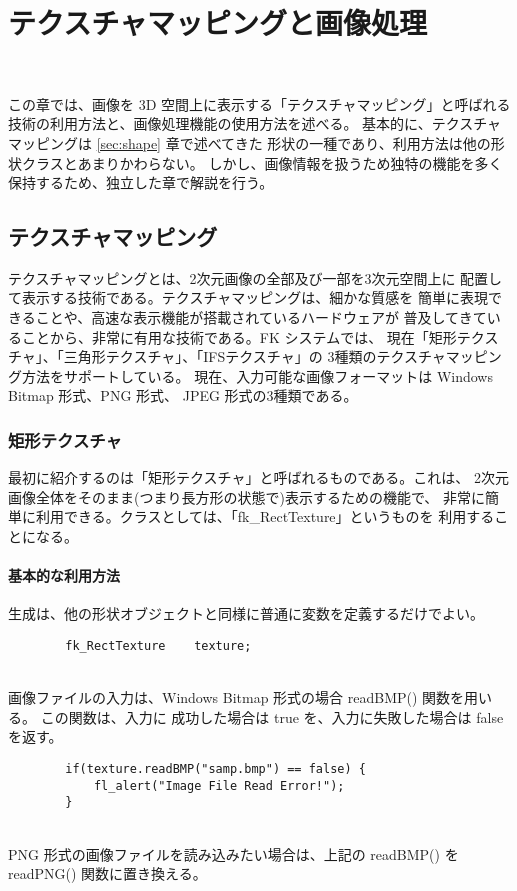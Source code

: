 \chapter{テクスチャマッピングと画像処理} \label{sec:imagetexture} ~

この章では、画像を 3D 空間上に表示する「テクスチャマッピング」と呼ばれる
技術の利用方法と、画像処理機能の使用方法を述べる。
基本的に、テクスチャマッピングは \ref{sec:shape} 章で述べてきた
形状の一種であり、利用方法は他の形状クラスとあまりかわらない。
しかし、画像情報を扱うため独特の機能を多く保持するため、独立した章で解説を行う。

\section{テクスチャマッピング} \label{subsec:texture}
テクスチャマッピングとは、2次元画像の全部及び一部を3次元空間上に
配置して表示する技術である。テクスチャマッピングは、細かな質感を
簡単に表現できることや、高速な表示機能が搭載されているハードウェアが
普及してきていることから、非常に有用な技術である。FK システムでは、
現在「矩形テクスチャ」、「三角形テクスチャ」、「IFSテクスチャ」の
3種類のテクスチャマッピング方法をサポートしている。
現在、入力可能な画像フォーマットは Windows Bitmap 形式、PNG 形式、
JPEG 形式の3種類である。

\subsection{矩形テクスチャ}
最初に紹介するのは「矩形テクスチャ」と呼ばれるものである。これは、
2次元画像全体をそのまま(つまり長方形の状態で)表示するための機能で、
非常に簡単に利用できる。クラスとしては、「fk\_RectTexture」というものを
利用することになる。

\subsubsection{基本的な利用方法}
生成は、他の形状オブジェクトと同様に普通に変数を定義するだけでよい。
\\
\begin{screen}
\begin{verbatim}
        fk_RectTexture    texture;
\end{verbatim}
\end{screen}
~ \\
画像ファイルの入力は、Windows Bitmap 形式の場合 readBMP() 関数を用いる。
この関数は、入力に
成功した場合は true を、入力に失敗した場合は false を返す。
\\
\begin{breakbox}
\begin{verbatim}
        if(texture.readBMP("samp.bmp") == false) {
            fl_alert("Image File Read Error!");
        }
\end{verbatim}
\end{breakbox}
~ \\
PNG 形式の画像ファイルを読み込みたい場合は、上記の readBMP() を
readPNG() 関数に置き換える。

